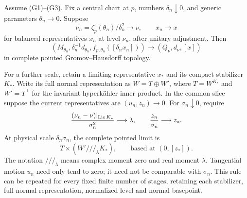 \begin{proposition}\label{prop:successive-limits}
Assume \textup{(G1)--(G3)}.
Fix a central chart at \(p\), numbers \(\delta_n\downarrow0\),
and generic parameters \(\theta_n\to0\).
Suppose
\[
 \nu_n=\zeta_p(\theta_n)/\delta_n^2\longrightarrow\nu,
 \qquad x_n\longrightarrow x
\]
for balanced representatives \(x_n\) at level \(\nu_n\),
after unitary adjustment. Then
\begin{equation}\label{eq:first-rescaling}
 (M_{\theta_n},\delta_n^{-1}d_{\theta_n},
               f_{p,\theta_n}([\delta_nx_n]))
 \longrightarrow(Q_\nu,d_\nu,[x])
\end{equation}
in complete pointed Gromov--Hausdorff topology.

For a further scale, retain a limiting representative \(x_*\)
and its compact stabilizer \(K_*\).
Write its full normal representation as
\(W=T\oplus W'\), where \(T=W^{K_*}\) and
\(W'=T^\perp\) for the invariant hyperk\"ahler inner product.
In the common slice suppose the current representatives are
\((u_n,z_n)\to0\). For \(\sigma_n\downarrow0\), require
\begin{equation}\label{eq:successive-data}
 \frac{(\nu_n-\nu)|_{\operatorname{Lie} K_*}}{\sigma_n^2}\longrightarrow\lambda,
 \qquad \frac{z_n}{\sigma_n}\longrightarrow z_* .
\end{equation}
At physical scale \(\delta_n\sigma_n\), the complete pointed
limit is
\[
 T\times(W'\!/\!/\!/_\lambda K_*),\qquad
 \text{based at }(0,[z_*]).
\]
The notation \( /\!/\!/_\lambda\) means complex moment zero
and real moment \(\lambda\).
Tangential motion \(u_n\) need only tend to zero; it need not
be comparable with \(\sigma_n\).
This rule can be repeated for every fixed finite number of
stages, retaining each stabilizer, full normal representation,
normalized level and normal basepoint.
\end{proposition}

